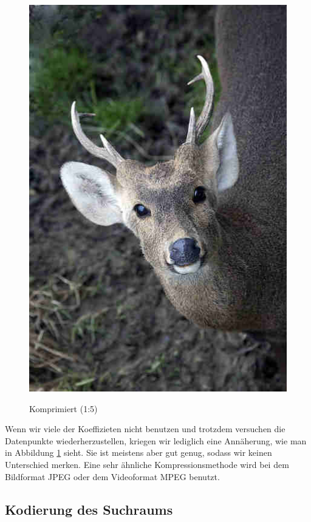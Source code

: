 \begin{multicols}{2}
\begin{figure}[H]
\begin{center}
                    \includegraphics[scale=0.36]{../pictures/gazelle-compressed.jpg}\\
                    \caption{Komprimiert (1:5)}\label{fig:gazelle-compressed}
                \end{center}
            \end{figure}
        \end{multicols}

        \noindent
        Wenn wir viele der Koeffizieten nicht benutzen und trotzdem versuchen die Datenpunkte wiederherzustellen, kriegen wir lediglich eine Annäherung, wie man in Abbildung \ref{fig:gazelle-compressed} sieht. Sie ist meistens aber gut genug, sodass wir keinen Unterschied merken. Eine sehr ähnliche Kompressionsmethode wird bei dem Bildformat JPEG \cite{jpeg} oder dem Videoformat MPEG \cite{mitchell1997mpeg} benutzt.

        \subsection{Kodierung des Suchraums}

